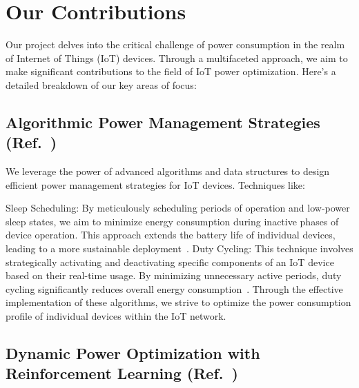 \documentclass[11pt,a4paper]{article}
\begin{document}
\section{Our Contributions}
Our project delves into the critical challenge of power consumption in the realm of Internet of Things (IoT) devices. Through a multifaceted approach, we aim to make significant contributions to the field of IoT power optimization. Here's a detailed breakdown of our key areas of focus:

\subsection{Algorithmic Power Management Strategies (Ref.~\cite{Al-Fuqaha_IoT_Survey_2015, Farahani_Survey_Green_IoT_2018})}

We leverage the power of advanced algorithms and data structures to design efficient power management strategies for IoT devices. Techniques like:

Sleep Scheduling: By meticulously scheduling periods of operation and low-power sleep states, we aim to minimize energy consumption during inactive phases of device operation. This approach extends the battery life of individual devices, leading to a more sustainable deployment~\cite{Akyildiz_Wireless_Sensor_Networks_2007}.
Duty Cycling: This technique involves strategically activating and deactivating specific components of an IoT device based on their real-time usage. By minimizing unnecessary active periods, duty cycling significantly reduces overall energy consumption~\cite{Huang_Survey_Green_IoT_2014}.
Through the effective implementation of these algorithms, we strive to optimize the power consumption profile of individual devices within the IoT network.

\subsection{Dynamic Power Optimization with Reinforcement Learning (Ref.~\cite{Liu_Survey_RL_IoT_2020, Mohammadi_RL_Resource_Management_2020})}
\end{document}
